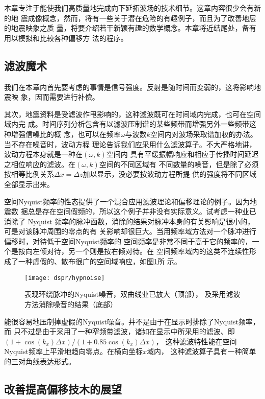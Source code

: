 本章专注于能使我们高质量地完成向下延拓波场的技术细节。这章内容很少会有新的地
震成像概念，然而，将有一些关于潜在危险的有趣例子，而且为了改善地层的地震映象之质
量，将要介绍若干新颖有趣的数学概念。本章将近结尾处，备有用以模拟和比较各种偏移方
法的程序。

\subsection{滤波魔术}
\label{sec:4.0.1}

我们在本章内首先要考虑的事情是信号强度。反射是随时间而变弱的，这将影响地震映
象，因而需要进行补偿。

其次，地震资料是受滤波作甩影响的，这种滤波既可在时间域内完成，也可在空间域内完
成。时间序列分析包含有以滤波压制谱的某些频带而增强另外一些频带这种增强信噪比的概
念，也可以在频率$\omega$与波数$k$空间内对波场采取谱加权的办法。当不存在噪音时，波动方程
理论告诉我们应采用什么滤波算子。不大严格地讲，波动方程本身就是一种在$(\omega,k)$空间内
具有平缓振幅响应和相应于传播时间延迟之相位响应的滤波。在$(\omega,k)$空间的不同区域有
不同数量的噪音，但是除了必须按相等比例关系$\Delta x=\Delta z$加以显示，没必要按波动方程所提
供的强度将不同区域全部显示出来。

空间Nyquist频率的性态提供了一个混合应用滤波理论和偏移理论的例子。因为地震数
据总是存在空间假频的，所以这个例子并非没有实际意义。试考虑一种业已消除了
Nyquist
频率的脉冲函数，消除的结果对脉冲本身的有关影响是很小的，可是对该脉冲周围的零点的有
关影响却很巨大。当用频率域方法对一个脉冲进行偏移时，对待低于空间Nyquist频率的
空间频率是非常不同于高于它的频率的，一个是按向左倾对待，另一个则是按右倾对待。在
空间频率域内的这类不连续性形成了一种虚假的、散布很广的空间域响应，如图\ref{fig:dspr/hypnoise}所
示。

\begin{figure}[H]
\centering
\texttt{[image: dspr/hypnoise]}
\caption[hypnoise]{表现环绕脉冲的Nyquist噪音，双曲线业已放大（顶部），
及采用滤波方法消除噪音的结果（底部）}
\label{fig:dspr/hypnoise}
\end{figure}

能很容易地压制掉虚假的Nyquist噪音。并不是由于在显示时排除了Nyquist频率，而
只不过是由于采用了一种窄频带滤波，诸如在显示中所采用的滤波、即$
(1+\cos(k_x) \Delta x)/(1+0.85\cos(k_x)\Delta x)$，
这种滤波特性能在空间Nyquist频率上平滑地趋向零点。在横向坐标$x$域内，
这种滤波算子具有一种简单的三对角线表达形式。

\subsection{改善提高偏移技木的展望}
\label{sec:4.0.2}

